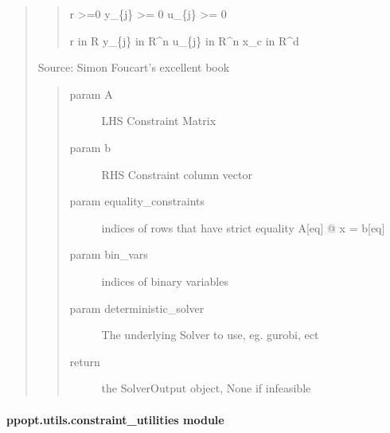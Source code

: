 \documentclass[letterpaper,10pt,english]{sphinxmanual}
\begin{document}
\begin{fulllineitems}
\begin{quote}
\begin{quote}
\sphinxAtStartPar
r \textgreater{}=0
y\_\{j\} \textgreater{}= 0
u\_\{j\} \textgreater{}= 0

\sphinxAtStartPar
r in R
y\_\{j\} in R\textasciicircum{}n
u\_\{j\} in R\textasciicircum{}n
x\_c in R\textasciicircum{}d
\end{quote}

\sphinxAtStartPar
Source: Simon Foucart’s excellent book
\begin{quote}\begin{description}
\item[{param A}] \leavevmode
\sphinxAtStartPar
LHS Constraint Matrix

\item[{param b}] \leavevmode
\sphinxAtStartPar
RHS Constraint column vector

\item[{param equality\_constraints}] \leavevmode
\sphinxAtStartPar
indices of rows that have strict equality A{[}eq{]} @ x = b{[}eq{]}

\item[{param bin\_vars}] \leavevmode
\sphinxAtStartPar
indices of binary variables

\item[{param deterministic\_solver}] \leavevmode
\sphinxAtStartPar
The underlying Solver to use, eg. gurobi, ect

\item[{return}] \leavevmode
\sphinxAtStartPar
the SolverOutput object, None if infeasible

\end{description}\end{quote}
\end{quote}

\end{fulllineitems}



\paragraph{ppopt.utils.constraint\_utilities module}
\label{\detokenize{ppopt.utils:module-ppopt.utils.constraint_utilities}}\label{\detokenize{ppopt.utils:ppopt-utils-constraint-utilities-module}}
\end{document}
